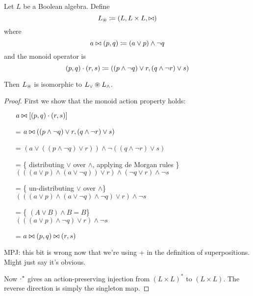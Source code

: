 \begin{prop}
  Let $L$ be a Boolean algebra. Define
  $$L_\circledast \coloneqq (L,L \times L,\bowtie)$$
  where
  $$a \bowtie (p, q) \coloneqq (a \vee p) \wedge \neg q$$
  and the monoid operator is
  $$(p, q) \cdot (r, s) \coloneqq ((p \wedge \neg q) \vee r, (q \wedge \neg r) \vee s)$$

  Then $L_\circledast$ is isomorphic to $L_\vee \circledast L_\wedge$.
\end{prop}
\begin{proof}
  First we show that the monoid action property holds:
  \begin{itemize}
    \item[ ]$a \bowtie \left[(p, q) \cdot (r, s)\right]$
    \item[=]$a \bowtie ((p \wedge \neg q) \vee r, (q \wedge \neg r) \vee s)$
    \item[=]$
      \left(
        a \vee
        \left(
          \left(
            p \wedge \neg q
          \right)
          \vee r
        \right)
      \right)
      \wedge \neg
      \left(
        \left(
          q \wedge \neg r
        \right)
        \vee s
      \right)$
    \item[=]\{ distributing $\vee$ over $\wedge$, applying de Morgan rules \}\\
      $
      \left(
        \left(
          \left(  
            a \vee p
          \right)
          \wedge
          \left(
            a \vee \neg q
          \right)
        \right)
        \vee r
      \right)
      \wedge 
      \left(
        \neg q \vee r
      \right)
      \wedge
      \neg s
      $
    \item[=]\{ un-distributing $\vee$ over $\wedge $\}\\
      $
      \left(
        \left(
          \left(  
            a \vee p
          \right)
          \wedge
          \left(
            a \vee \neg q
          \right)
          \wedge
          \neg q
        \right)
        \vee r
      \right)
      \wedge
      \neg s
      $
    \item[=]\{ $(A \vee B) \wedge B = B$\}\\
      $
      \left(
        \left(
          \left(  
            a \vee p
          \right)
          \wedge
          \neg q
        \right)
        \vee r
      \right)
      \wedge
      \neg s
      $
    \item[=]$a \bowtie (p, q) \bowtie (r, s)$
  \end{itemize}


  MPJ: this bit is wrong now that we're using $+$ in the definition of
  superpositions. Might just say it's obvious.
  
  Now $\cdot^\ast$ gives an action-preserving injection from $(L \times
  L)^\ast$ to $(L \times L)$. The reverse direction is simply the singleton map.
\end{proof}

